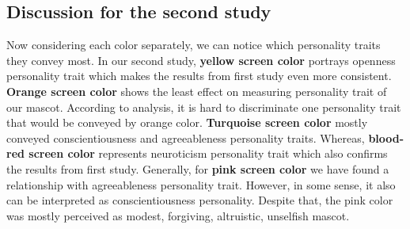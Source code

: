 \subsection{Discussion for the second study}
Now considering each color separately, we can notice which personality traits they convey most. In our second study, \textbf{yellow screen color} portrays openness personality trait which makes the results from first study even more consistent. \textbf{Orange screen color} shows the least effect on measuring personality trait of our mascot. According to analysis, it is hard to discriminate one personality trait that would be conveyed by orange color. \textbf{Turquoise screen color} mostly conveyed conscientiousness and agreeableness personality traits. Whereas, \textbf{blood-red screen color} represents neuroticism personality trait which also confirms the results from first study. Generally, for \textbf{pink screen color} we have found a relationship with agreeableness personality trait. However, in some sense, it also can be interpreted as conscientiousness personality. Despite that, the pink color was mostly perceived as modest, forgiving, altruistic, unselfish mascot.
